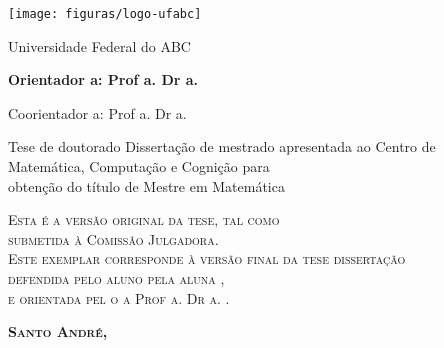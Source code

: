 \thispagestyle{empty}
\texttt{[image: figuras/logo-ufabc]} \hfill

\vspace{1.37cm}
\begin{center}
  {\large  Universidade Federal do ABC
  \vspace{.5cm}}
\end{center}
\vspace{.7cm}
\begin{center}
  {\large \autor}
\end{center}
\vspace{.7cm}
\begin{center}
  {\LARGE \bfseries \titulo}
\end{center}
\vspace{1cm}
{\bfseries
\noindent
Orientador\ifx\femaleOrientador\undefined
\else
a\fi: Prof\ifx\femaleOrientador\undefined
\else
a\fi. Dr\ifx\femaleOrientador\undefined
\else
a\fi. \orientador
\vspace{.25cm}

\ifx\coorientador\undefined
\else
\noindent
Coorientador\ifx\femaleCoorientador\undefined
\else
a\fi: Prof\ifx\femaleCoorientador\undefined
\else
a\fi. Dr\ifx\femaleCoorientador\undefined
\else
a\fi. \coorientador
\fi
}

\vspace{1.4cm}
\begin{flushright}
  \begin{minipage}[c]{.6\textwidth}
    \begin{flushleft}
      \ifx\mestrado\undefined
      \noindent Tese de doutorado
      \else
    \noindent   Dissertação de mestrado
      \fi
      apresentada ao Centro de Matemática, Computação e Cognição para \\ \noindent  obtenção do título de
      Mestre em Matemática 
    \end{flushleft}
  \end{minipage}
\end{flushright}
\vspace{1.3cm}
  \ifx\versaofinal\undefined
\noindent 
{\footnotesize \scshape
Esta é a versão original da tese, tal como\\
submetida à Comissão Julgadora.\\
}
\else
\noindent 
{\footnotesize \scshape
Este exemplar corresponde à versão final da 
\ifx\mestrado\undefined
tese
\else
dissertação
\fi \\
defendida 
\ifx\femaleAuthor\undefined
pelo aluno 
\else
pela aluna
\fi
\autor,\\
e orientada pel\ifx\femaleOrientador\undefined
o\else
a\fi{} Prof\ifx\femaleOrientador\undefined
\else
a\fi. Dr\ifx\femaleOrientador\undefined
\else
a\fi. \orientador.
}
\fi



\vspace{1.2cm}


\vfill
\begin{center}
  {\small \scshape \bfseries Santo André, \ano}
\end{center}
